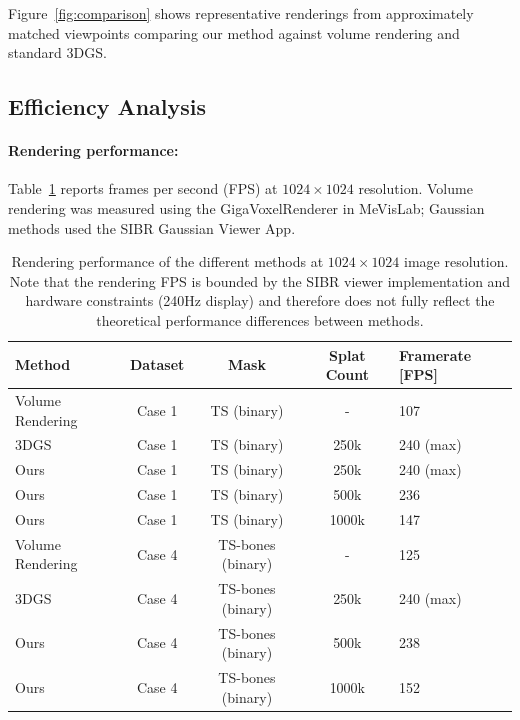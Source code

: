 \documentclass[runningheads]{llncs}
\begin{document}

Figure~\ref{fig:comparison} shows representative renderings from approximately matched viewpoints comparing our method against volume rendering and standard 3DGS.

\subsection{Efficiency Analysis}

\paragraph{Rendering performance:}
Table~\ref{tab:fps} reports frames per second (FPS) at $1024 \times 1024$ resolution. Volume rendering was measured using the GigaVoxelRenderer in MeVisLab; Gaussian methods used the SIBR Gaussian Viewer App.

\begin{table}
\centering
\caption{Rendering performance of the different methods at $1024 \times 1024$ image resolution. Note that the rendering FPS is bounded by the SIBR viewer implementation and hardware constraints (240Hz display) and therefore does not fully reflect the theoretical performance differences between methods.}\label{tab:fps}
\setlength{\tabcolsep}{4pt}
\renewcommand{\arraystretch}{1.1}
\begin{tabular}{|l|c|c|c|l|}
\hline
Method & Dataset & Mask & Splat Count & Framerate [FPS]\\
\hline
Volume Rendering    & Case 1  & TS (binary) & - & 107\\
3DGS                & Case 1  & TS (binary) & 250k & 240 (max) \\
Ours                & Case 1  & TS (binary) & 250k & 240 (max) \\
Ours                & Case 1  & TS (binary) & 500k & 236 \\
Ours                & Case 1  & TS (binary) & 1000k & 147 \\
Volume Rendering    & Case 4  & TS-bones (binary) & - & 125\\
3DGS                & Case 4  & TS-bones (binary) & 250k & 240 (max) \\
Ours                & Case 4  & TS-bones (binary) & 500k & 238 \\
Ours                & Case 4  & TS-bones (binary) & 1000k & 152 \\


\hline
\end{tabular}
\end{table}
\end{document}
